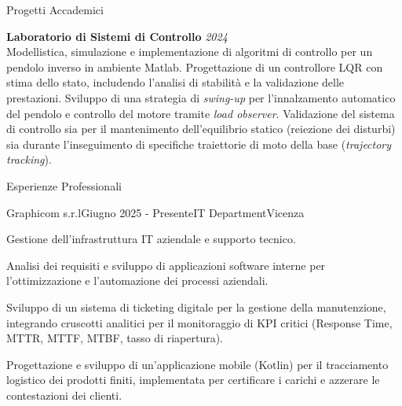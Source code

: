 \documentclass[
	11pt, %
]{resume} %
\begin{document}
\begin{rSection}{Progetti Accademici}
	
	\textbf{Laboratorio di Sistemi di Controllo} \hfill \textit{2024} \\
	Modellistica, simulazione e implementazione di algoritmi di controllo per un pendolo inverso in ambiente Matlab. Progettazione di un controllore LQR con stima dello stato, includendo l'analisi di stabilità e la validazione delle prestazioni. Sviluppo di una strategia di \textit{swing-up} per l'innalzamento automatico del pendolo e controllo del motore tramite \textit{load observer}. Validazione del sistema di controllo sia per il mantenimento dell'equilibrio statico (reiezione dei disturbi) sia durante l'inseguimento di specifiche traiettorie di moto della base (\textit{trajectory tracking}).
	
\end{rSection}


\begin{rSection}{Esperienze Professionali}

	\begin{rSubsection}{Graphicom s.r.l}{Giugno 2025 - Presente}{IT Department}{Vicenza}
		\item Gestione dell'infrastruttura IT aziendale e supporto tecnico.
		\item Analisi dei requisiti e sviluppo di applicazioni software interne per l'ottimizzazione e l'automazione dei processi aziendali.
		\item Sviluppo di un sistema di ticketing digitale per la gestione della manutenzione, integrando cruscotti analitici per il monitoraggio di KPI critici (Response Time, MTTR, MTTF, MTBF, tasso di riapertura).
		\item Progettazione e sviluppo di un'applicazione mobile (Kotlin) per il tracciamento logistico dei prodotti finiti, implementata per certificare i carichi e azzerare le contestazioni dei clienti.
	\end{rSubsection}



\end{rSection}

\end{document}
